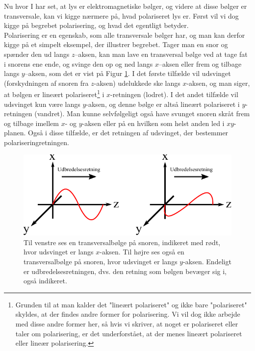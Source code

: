 Nu hvor I har set, at lys er elektromagnetiske bølger, og videre at disse bølger er transversale, kan vi kigge nærmere på, hvad polariseret lys er. Først vil vi dog kigge på begrebet polarisering, og hvad det egentligt betyder.\\

Polarisering er en egenskab, som alle transversale bølger har, og man kan derfor kigge på et simpelt eksempel, der illustrer begrebet. Tager man en snor og spænder den ud langs $z$--aksen, kan man lave en transversal bølge ved at tage fat i snorens ene ende, og svinge den op og ned langs $x$--aksen eller frem og tilbage langs $y$--aksen, som det er vist på Figur \ref{pol_lys}. I det første tilfælde vil udsvinget (forskydningen af snoren fra $z$-aksen) udelukkede ske langs $x$-aksen, og man siger, at bølgen er lineært polariseret\footnote{Grunden til at man kalder det "lineært polariseret" og ikke bare "polariseret" skyldes, at der findes andre former for polarisering. Vi vil dog ikke arbejde med disse andre former her, så hvis vi skriver, at noget er polariseret eller taler om polarisering, er det underforstået, at der menes lineært polariseret eller lineær polarisering.} i $x$-retningen (lodret). I det andet tilfælde vil udsvinget kun være langs $y$-aksen, og denne bølge er altså lineært polariseret i $y$-retningen (vandret). Man kunne selvfølgeligt også have svunget snoren skråt frem og tilbage imellem $x$- og $y$-aksen eller på en hvilken som helst anden led i $xy$-planen. Også i disse tilfælde, er det retningen af udsvinget, der bestemmer polariseringretningen. \\  

\begin{figure}[h!]
	\centering
	\includegraphics[scale=1.1]{Elektrodynamik/pol_lys_fig.pdf}
	\caption{Til venstre ses en transversalbølge på snoren, indikeret med rødt, hvor udsvinget er langs $x$-aksen. Til højre ses også en transversalbølge på snoren, hvor udsvinget er langs $y$-aksen. Endeligt er udbredelsesretningen, dvs. den retning som bølgen bevæger sig i, også indikeret.}
	\label{pol_lys}
\end{figure}


